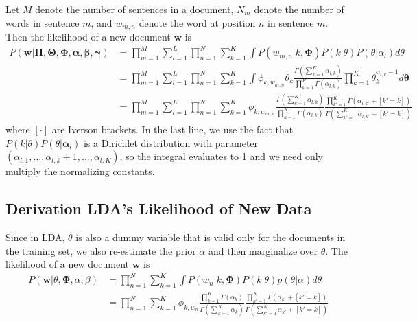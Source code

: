 \documentclass{article}
\begin{document}
Let $M$ denote the number of sentences in a document, $N_m$ denote
the number of words in sentence $m$, and $w_{m,n}$ denote the word
at position $n$ in sentence $m$. Then the likelihood of a new
document $\mathbf{w}$ is
\begin{equation} \label{eqn:subjlda-likelihood}
\begin{aligned}
P(\mathbf{w} | \mathbf{\Pi,\Theta,\Phi,\alpha,\beta,\gamma}) 
    &= \prod_{m=1}^M \sum_{l=1}^L \prod_{n=1}^N \sum_{k=1}^K \int P(w_{m,n} | k, \mathbf{\Phi} ) P( k | \theta ) P ( \theta | \alpha_l) d\theta \\
    &= \prod_{m=1}^M \sum_{l=1}^L \prod_{n=1}^N \sum_{k=1}^K \int \phi_{k,w_{m,n}} \theta_k \frac{\Gamma \left( \sum_{k=1}^K \alpha_{l,k} \right)}{\prod_{k=1}^K \Gamma(\alpha_{l,k})} \prod_{k=1}^K \theta_k^{\alpha_{l,k} - 1} d\mathbf{\theta} \\
    &= \prod_{m=1}^M \sum_{l=1}^L \prod_{n=1}^N \sum_{k=1}^K \phi_{k,w_{m,n}} \frac{\Gamma \left( \sum_{k=1}^K \alpha_{l,k} \right)}{\prod_{k=1}^K \Gamma(\alpha_{l,k})} \frac{\prod_{k'=1}^K \Gamma(\alpha_{l,k'} + \left[ k' = k \right])}{\Gamma \left( \sum_{k'=1}^K \alpha_{l,k'} + \left[ k' = k \right] \right)}
\end{aligned}
\end{equation}
where $[\cdot]$ are Iverson brackets. In the last line, we use the
fact that $P( k | \theta ) P ( \theta | \mathbf{\alpha}_l)$ is a
Dirichlet distribution with parameter $(\alpha_{l,1}, \ldots,
\alpha_{l,k} + 1, \ldots, \alpha_{l,K})$, so the integral evaluates
to 1 and we need only multiply the normalizing constants.

\subsection{Derivation LDA's Likelihood of New Data}
Since in LDA, $\theta$ is also a dummy variable that is valid only
for the documents in the training set, we also re-estimate the prior
$\alpha$ and then marginalize over $\theta$. The likelihood of a new
document $\mathbf{w}$ is
\begin{equation} \label{eqn:lda-likelihood}
\begin{aligned}
P(\mathbf{w} | \theta, \mathbf{\Phi}, \alpha, \beta )
 &= \prod_{n=1}^N \sum_{k=1}^K \int P(w_n | k, \mathbf{\Phi}) P(k | \theta) p(\theta | \alpha) d\theta \\
 &= \prod_{n=1}^N \sum_{k=1}^K \phi_{k,w_n} \frac{\prod_{k=1}^K \Gamma(\alpha_{k})}{\Gamma \left( \sum_{k=1}^K \alpha_{k} \right)} \frac{\prod_{k'=1}^K \Gamma(\alpha_{k'} + \left[ k' = k \right])}{\Gamma \left( \sum_{k'=1}^K \alpha_{k'} + \left[ k' = k \right] \right)}
\end{aligned}
\end{equation}
\end{document}
